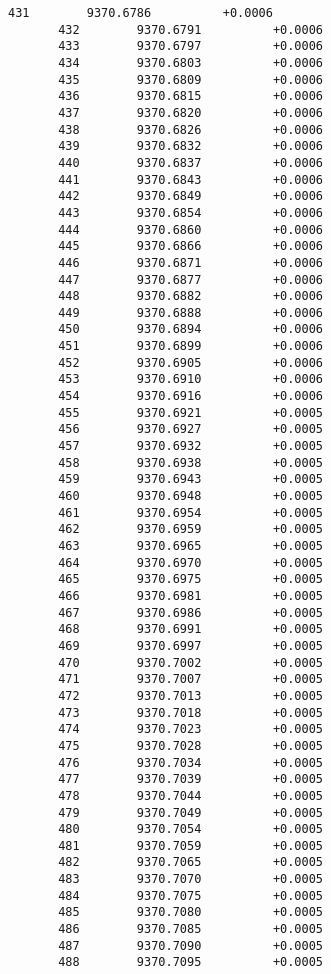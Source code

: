 \documentclass[11pt]{article}
\begin{document}
\begin{Verbatim}[commandchars=\\\{\}]
       431        9370.6786          +0.0006
       432        9370.6791          +0.0006
       433        9370.6797          +0.0006
       434        9370.6803          +0.0006
       435        9370.6809          +0.0006
       436        9370.6815          +0.0006
       437        9370.6820          +0.0006
       438        9370.6826          +0.0006
       439        9370.6832          +0.0006
       440        9370.6837          +0.0006
       441        9370.6843          +0.0006
       442        9370.6849          +0.0006
       443        9370.6854          +0.0006
       444        9370.6860          +0.0006
       445        9370.6866          +0.0006
       446        9370.6871          +0.0006
       447        9370.6877          +0.0006
       448        9370.6882          +0.0006
       449        9370.6888          +0.0006
       450        9370.6894          +0.0006
       451        9370.6899          +0.0006
       452        9370.6905          +0.0006
       453        9370.6910          +0.0006
       454        9370.6916          +0.0006
       455        9370.6921          +0.0005
       456        9370.6927          +0.0005
       457        9370.6932          +0.0005
       458        9370.6938          +0.0005
       459        9370.6943          +0.0005
       460        9370.6948          +0.0005
       461        9370.6954          +0.0005
       462        9370.6959          +0.0005
       463        9370.6965          +0.0005
       464        9370.6970          +0.0005
       465        9370.6975          +0.0005
       466        9370.6981          +0.0005
       467        9370.6986          +0.0005
       468        9370.6991          +0.0005
       469        9370.6997          +0.0005
       470        9370.7002          +0.0005
       471        9370.7007          +0.0005
       472        9370.7013          +0.0005
       473        9370.7018          +0.0005
       474        9370.7023          +0.0005
       475        9370.7028          +0.0005
       476        9370.7034          +0.0005
       477        9370.7039          +0.0005
       478        9370.7044          +0.0005
       479        9370.7049          +0.0005
       480        9370.7054          +0.0005
       481        9370.7059          +0.0005
       482        9370.7065          +0.0005
       483        9370.7070          +0.0005
       484        9370.7075          +0.0005
       485        9370.7080          +0.0005
       486        9370.7085          +0.0005
       487        9370.7090          +0.0005
       488        9370.7095          +0.0005

\end{Verbatim}
\end{document}

